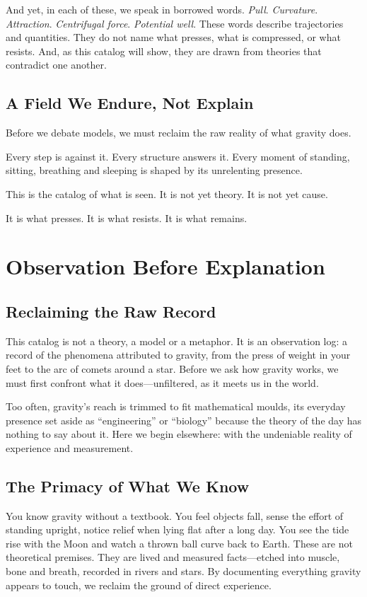 \documentclass[11pt,a4paper]{article}
\begin{document}
And yet, in each of these, we speak in borrowed words. \emph{Pull}. \emph{Curvature}. \emph{Attraction}. \emph{Centrifugal force}. \emph{Potential well}. These words describe trajectories and quantities. They do not name what presses, what is compressed, or what resists. And, as this catalog will show, they are drawn from theories that contradict one another.

\subsection*{A Field We Endure, Not Explain}

Before we debate models, we must reclaim the raw reality of what gravity does.

Every step is against it. Every structure answers it. Every moment of standing, sitting, breathing and sleeping is shaped by its unrelenting presence.

This is the catalog of what is seen. It is not yet theory. It is not yet cause.

It is what presses. It is what resists. It is what remains.

\section{Observation Before Explanation}

\subsection{Reclaiming the Raw Record}

This catalog is not a theory, a model or a metaphor. It is an observation log: a record of the phenomena attributed to gravity, from the press of weight in your feet to the arc of comets around a star. Before we ask how gravity works, we must first confront what it does---unfiltered, as it meets us in the world.

Too often, gravity's reach is trimmed to fit mathematical moulds, its everyday presence set aside as ``engineering'' or ``biology'' because the theory of the day has nothing to say about it. Here we begin elsewhere: with the undeniable reality of experience and measurement.

\subsection{The Primacy of What We Know}

You know gravity without a textbook. You feel objects fall, sense the effort of standing upright, notice relief when lying flat after a long day. You see the tide rise with the Moon and watch a thrown ball curve back to Earth. These are not theoretical premises. They are lived and measured facts---etched into muscle, bone and breath, recorded in rivers and stars. By documenting everything gravity appears to touch, we reclaim the ground of direct experience.
\end{document}

